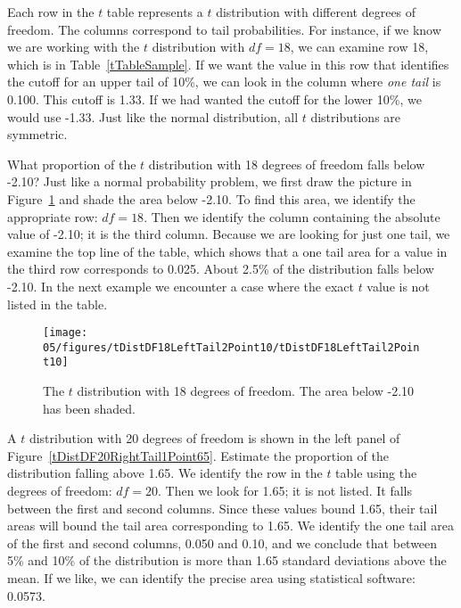Each row in the $t$ table represents a $t$ distribution with different degrees of freedom. The columns correspond to tail probabilities. For instance, if we know we are working with the $t$ distribution with $df=18$, we can examine row 18, which is  in Table~\ref{tTableSample}. If we want the value in this row that identifies the cutoff for an upper tail of 10\%, we can look in the column where \emph{one tail} is 0.100. This cutoff is 1.33. If we had wanted the cutoff for the lower 10\%, we would use -1.33. Just like the normal distribution, all $t$ distributions are symmetric.

\begin{example}{What proportion of the $t$ distribution with 18 degrees of freedom falls below -2.10?}
Just like a normal probability problem, we first draw the picture in Figure~\ref{tDistDF18LeftTail2Point10} and shade the area below -2.10. To find this area, we identify the appropriate row: $df=18$. Then we identify the column containing the absolute value of -2.10; it is the third column. Because we are looking for just one tail, we examine the top line of the table, which shows that a one tail area for a value in the third row corresponds to 0.025. About 2.5\% of the distribution falls below -2.10. In the next example we encounter a case where the exact $t$ value is not listed in the table.
\end{example}

\begin{figure}
\centering
\texttt{[image: 05/figures/tDistDF18LeftTail2Point10/tDistDF18LeftTail2Point10]}
\caption{The $t$ distribution with 18 degrees of freedom. The area below -2.10 has been shaded.}
\label{tDistDF18LeftTail2Point10}
\end{figure}

\textB{\pagebreak}

\begin{example}{A $t$ distribution with 20 degrees of freedom is shown in the left panel of Figure~\ref{tDistDF20RightTail1Point65}. Estimate the proportion of the distribution falling above 1.65.}
We identify the row in the $t$ table using the degrees of freedom: $df=20$. Then we look for 1.65; it is not listed. It falls between the first and second columns. Since these values bound 1.65, their tail areas will bound the tail area corresponding to 1.65. We identify the one tail area of the first and second columns, 0.050 and 0.10, and we conclude that between 5\% and 10\% of the distribution is more than 1.65 standard deviations above the mean. If we like, we can identify the precise area using statistical software: 0.0573.
\end{example}

